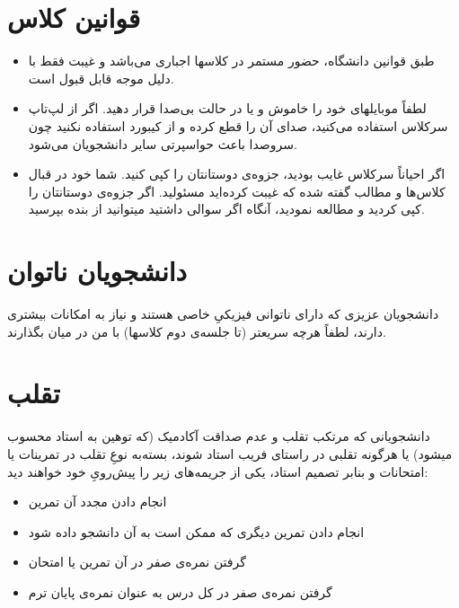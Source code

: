\documentclass[a4paper]{arman-syllabus}
\begin{document}
{\section*{قوانین کلاس}
\begin{itemize}
\item  طبق قوانین دانشگاه، حضور مستمر در کلاسها اجباری می‌باشد و غیبت فقط با دلیل موجه قابل قبول است.
\item لطفاً موبایلهای خود را خاموش و یا در حالت بی‌صدا قرار دهید. اگر از لپ‌تاپ سرکلاس استفاده می‌کنید، صدای آن را قطع کرده و از کیبورد استفاده نکنید چون سروصدا باعث حواسپرتی سایر دانشجویان می‌شود.
\item اگر احیاناً سرکلاس غایب بودید، جزوه‌ی دوستانتان را کپی کنید. شما خود در قبال کلاس‌ها و مطالب گفته شده که غیبت کرده‌اید مسئولید. اگر جزوه‌ی دوستانتان را کپی کردید و مطالعه نمودید، آنگاه اگر سوالی داشتید میتوانید از بنده بپرسید.
\end{itemize}
\section*{دانشجویان ناتوان}
دانشجویان عزیزی که دارای ناتوانی فیزیکیِ خاصی هستند و نیاز به امکانات بیشتری دارند، لطفاً هرچه سریعتر (تا جلسه‌ی دوم کلاسها)‌ با من در میان بگذارند.
\section*{تقلب}
دانشجویانی که مرتکب تقلب و عدم صداقت آکادمیک (که توهین به استاد محسوب میشود) یا هرگونه تقلبی در راستای فریب استاد شوند، بسته‌به نوعِ‌  تقلب  در تمرینات یا امتحانات و بنابر تصمیم استاد، یکی از جریمه‌های زیر را پیش‌رویِ خود خواهند دید:
\begin{itemize}
\item انجام دادن مجدد آن تمرین 
\item  انجام دادن تمرین دیگری که ممکن است به آن دانشجو داده شود
\item گرفتن نمره‌ی صفر در آن تمرین یا امتحان
\item  گرفتن نمر‌ه‌ی صفر در کل درس به عنوان نمره‌ی پایان ترم
\end{itemize}

}
\end{document}

